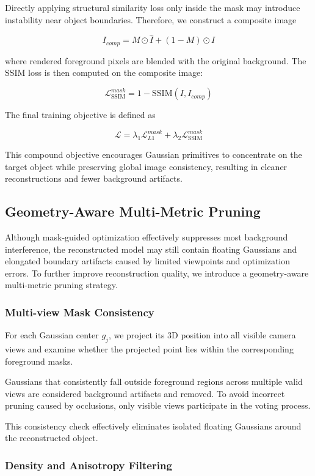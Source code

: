 Directly applying structural similarity loss only inside the mask may introduce instability near object boundaries. Therefore, we construct a composite image

$$
I_{comp} = M\odot\hat I + (1-M)\odot I
$$

where rendered foreground pixels are blended with the original background. The SSIM loss is then computed on the composite image:

$$
\mathcal{L}_{\mathrm{SSIM}}^{mask} = 1-\mathrm{SSIM}(I, I_{comp})
$$

The final training objective is defined as

$$
\mathcal{L} = \lambda_1\mathcal{L}_{L1}^{mask} + \lambda_2\mathcal{L}_{\mathrm{SSIM}}^{mask}
$$

This compound objective encourages Gaussian primitives to concentrate on the target object while preserving global image consistency, resulting in cleaner reconstructions and fewer background artifacts.

\subsection{Geometry-Aware Multi-Metric Pruning}

Although mask-guided optimization effectively suppresses most background interference, the reconstructed model may still contain floating Gaussians and elongated boundary artifacts caused by limited viewpoints and optimization errors. To further improve reconstruction quality, we introduce a geometry-aware multi-metric pruning strategy.

\subsubsection{Multi-view Mask Consistency} 

For each Gaussian center $g_j$, we project its 3D position into all visible camera views and examine whether the projected point lies within the corresponding foreground masks.

Gaussians that consistently fall outside foreground regions across multiple valid views are considered background artifacts and removed. To avoid incorrect pruning caused by occlusions, only visible views participate in the voting process.

This consistency check effectively eliminates isolated floating Gaussians around the reconstructed object.

\subsubsection{Density and Anisotropy Filtering}

